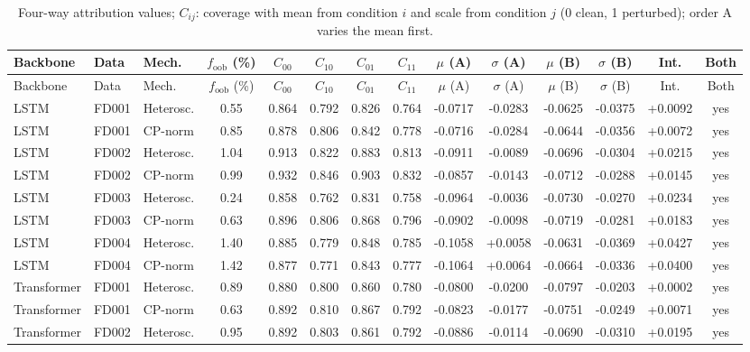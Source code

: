 \documentclass[10pt,a4paper]{article}
\begin{document}
\begin{landscape}\begin{center}\scriptsize
\begin{longtable}{lllccccccccccc}
\caption{Four-way attribution values; $C_{ij}$: coverage with mean from condition $i$ and scale from condition $j$ (0 clean, 1 perturbed); order A varies the mean first.}\\
\toprule Backbone & Data & Mech. & $f_{\mathrm{oob}}$ (\%) & $C_{00}$ & $C_{10}$ & $C_{01}$ & $C_{11}$ & $\mu$ (A) & $\sigma$ (A) & $\mu$ (B) & $\sigma$ (B) & Int. & Both \\ \midrule \endfirsthead
\toprule Backbone & Data & Mech. & $f_{\mathrm{oob}}$ (\%) & $C_{00}$ & $C_{10}$ & $C_{01}$ & $C_{11}$ & $\mu$ (A) & $\sigma$ (A) & $\mu$ (B) & $\sigma$ (B) & Int. & Both \\ \midrule \endhead
LSTM & FD001 & Heterosc. & 0.55 & 0.864 & 0.792 & 0.826 & 0.764 & -0.0717 & -0.0283 & -0.0625 & -0.0375 & +0.0092 & yes \\
LSTM & FD001 & CP-norm & 0.85 & 0.878 & 0.806 & 0.842 & 0.778 & -0.0716 & -0.0284 & -0.0644 & -0.0356 & +0.0072 & yes \\
LSTM & FD002 & Heterosc. & 1.04 & 0.913 & 0.822 & 0.883 & 0.813 & -0.0911 & -0.0089 & -0.0696 & -0.0304 & +0.0215 & yes \\
LSTM & FD002 & CP-norm & 0.99 & 0.932 & 0.846 & 0.903 & 0.832 & -0.0857 & -0.0143 & -0.0712 & -0.0288 & +0.0145 & yes \\
LSTM & FD003 & Heterosc. & 0.24 & 0.858 & 0.762 & 0.831 & 0.758 & -0.0964 & -0.0036 & -0.0730 & -0.0270 & +0.0234 & yes \\
LSTM & FD003 & CP-norm & 0.63 & 0.896 & 0.806 & 0.868 & 0.796 & -0.0902 & -0.0098 & -0.0719 & -0.0281 & +0.0183 & yes \\
LSTM & FD004 & Heterosc. & 1.40 & 0.885 & 0.779 & 0.848 & 0.785 & -0.1058 & +0.0058 & -0.0631 & -0.0369 & +0.0427 & yes \\
LSTM & FD004 & CP-norm & 1.42 & 0.877 & 0.771 & 0.843 & 0.777 & -0.1064 & +0.0064 & -0.0664 & -0.0336 & +0.0400 & yes \\
Transformer & FD001 & Heterosc. & 0.89 & 0.880 & 0.800 & 0.860 & 0.780 & -0.0800 & -0.0200 & -0.0797 & -0.0203 & +0.0002 & yes \\
Transformer & FD001 & CP-norm & 0.63 & 0.892 & 0.810 & 0.867 & 0.792 & -0.0823 & -0.0177 & -0.0751 & -0.0249 & +0.0071 & yes \\
Transformer & FD002 & Heterosc. & 0.95 & 0.892 & 0.803 & 0.861 & 0.792 & -0.0886 & -0.0114 & -0.0690 & -0.0310 & +0.0195 & yes \\

\end{longtable}
\end{center}
\end{landscape}
\end{document}
